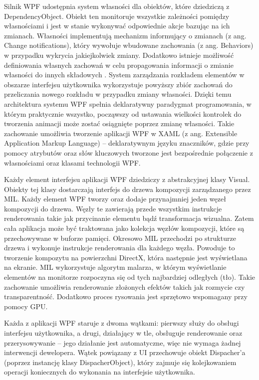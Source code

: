 Silnik WPF udostępnia system własności dla obiektów, które dziedziczą z DependencyObject. Obiekt ten monitoruje  wszystkie zależności pomiędzy własnościami i jest w stanie wykonywać odpowiednie akcje bazując na ich zmianach. Własności implementują mechanizm informujący o zmianach (z ang. Change notifications), który wywołuje wbudowane zachowania (z ang. Behaviors) w przypadku wykrycia jakiejkolwiek zmiany. Dodatkowo istnieje możliwość definiowania własnych zachowań w celu propagowania informacji o zmianie własności do innych składowych . System zarządzania rozkładem elementów w obszarze interfejsu użytkownika wykorzystuje powyższy zbiór zachowań do przeliczania nowego rozkładu w przypadku zmiany własności. Dzięki temu architektura systemu WPF spełnia deklaratywny paradygmat programowania, w którym praktycznie wszystko, począwszy od ustawania wielkości kontrolek do tworzenia animacji może zostać osiągnięte poprzez zmianę własności. Takie zachowanie umożliwia tworzenie aplikacji WPF w XAML (z ang. Extensible Application Markup Language) – deklaratywnym języku znaczników, gdzie przy pomocy atrybutów oraz słów kluczowych tworzone jest bezpośrednie połączenie z własnościami oraz klasami technologii WPF. 

Każdy element interfejsu aplikacji WPF dziedziczy z abstrakcyjnej klasy Visual. Obiekty tej klasy dostarczają interfejs do drzewa kompozycji zarządzanego przez MIL. Każdy element WPF tworzy oraz dodaje przynajmniej jeden węzeł kompozycji do drzewa. Węzły te zawierają przede wszystkim instrukcje renderowania takie jak przycinanie elementu bądź transformacja wizualna. Zatem cała aplikacja może być traktowana jako kolekcja węzłów kompozycji, które są przechowywane w buforze pamięci. Okresowo MIL przechodzi po strukturze drzewa i wykonuje instrukcje renderowania dla każdego węzła. Powoduje to tworzenie kompozytu na powierzchni DirectX, która następnie jest wyświetlana na ekranie.  MIL wykorzystuje algorytm malarza, w którym wyświetlanie elementów na monitorze rozpoczyna się od tych najbardziej odległych (tło). Takie zachowanie umożliwia renderowanie złożonych efektów takich jak rozmycie czy transparentność. Dodatkowo proces rysowania jest sprzętowo wspomagany przy pomocy GPU. 

Każda z aplikacji WPF staruje z dwoma wątkami: pierwszy służy do obsługi interfejsu użytkownika, a drugi, działający w tle, obsługuje renderowanie oraz przerysowywanie – jego działanie jest automatyczne, więc nie wymaga żadnej interwencji dewelopera. Wątek powiązany z UI przechowuje obiekt Dispacher’a (poprzez instancję klasy DispacherObject), który zajmuje się kolejkowaniem operacji koniecznych do wykonania na interfejsie użytkownika.

